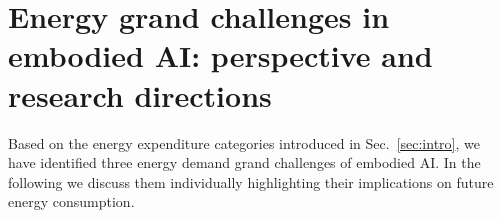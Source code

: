 \section{Energy grand challenges in embodied AI: perspective and research directions}
Based on the energy expenditure categories introduced in Sec.~\ref{sec:intro},  we have identified three energy demand grand challenges of embodied AI. In the following we discuss them individually highlighting their implications on future energy consumption.

